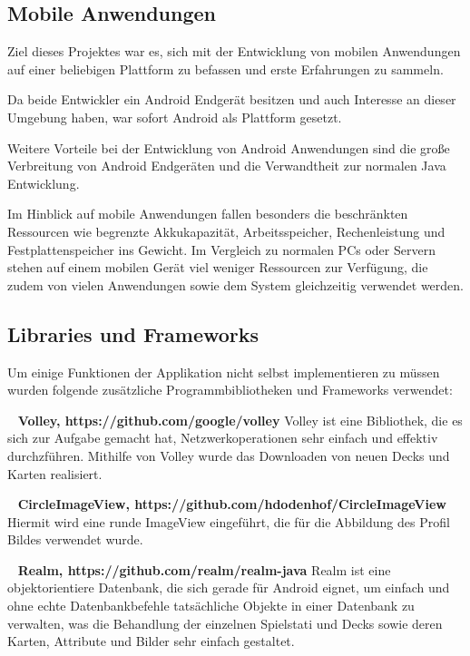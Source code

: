 \documentclass{scrartcl}
\begin{document}
\subsection{Mobile Anwendungen}
Ziel dieses Projektes war es, sich mit der Entwicklung von mobilen Anwendungen auf einer beliebigen Plattform zu befassen und erste Erfahrungen zu sammeln.

Da beide Entwickler ein Android Endgerät besitzen und auch Interesse an dieser Umgebung haben, war sofort Android als Plattform gesetzt.
 
Weitere Vorteile bei der Entwicklung von Android Anwendungen sind die große Verbreitung von Android Endgeräten und die Verwandtheit zur normalen Java Entwicklung.

Im Hinblick auf mobile Anwendungen fallen besonders die beschränkten Ressourcen wie begrenzte Akkukapazität, Arbeitsspeicher, Rechenleistung und Festplattenspeicher ins Gewicht.
Im Vergleich zu normalen PCs oder Servern stehen auf einem mobilen Gerät viel weniger Ressourcen zur Verfügung, die zudem von vielen Anwendungen sowie dem System gleichzeitig verwendet werden.

\subsection{Libraries und Frameworks}
Um einige Funktionen der Applikation nicht selbst implementieren zu müssen
wurden folgende zusätzliche Programmbibliotheken und Frameworks verwendet:

\noindent

\ \newline
\textbf{Volley, https://github.com/google/volley} \newline
Volley ist eine Bibliothek, die es sich zur Aufgabe gemacht hat, Netzwerkoperationen sehr einfach und effektiv durchzführen.
Mithilfe von Volley wurde das Downloaden von neuen Decks und Karten realisiert.

\ \newline
\textbf{CircleImageView, https://github.com/hdodenhof/CircleImageView} \newline
Hiermit wird eine runde ImageView eingeführt, die für die Abbildung des Profil Bildes verwendet wurde.

\ \newline
\textbf{Realm, https://github.com/realm/realm-java} \newline
Realm ist eine objektorientiere Datenbank, die sich gerade für Android eignet, um einfach und ohne echte Datenbankbefehle tatsächliche Objekte in einer Datenbank zu verwalten, was die Behandlung der einzelnen Spielstati und Decks sowie deren Karten, Attribute und Bilder sehr einfach gestaltet. 
\end{document}
